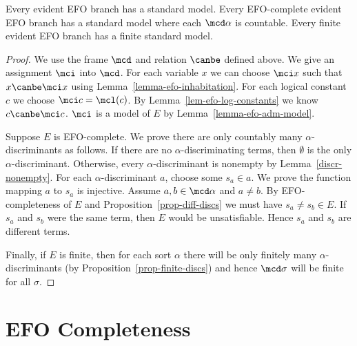 \begin{thm}
  \label{thm:efo-model-exist}
  Every evident EFO branch has a standard model.
  Every EFO-complete evident EFO branch has a standard model where each $\mcd\alpha$ is countable.
  Every finite evident EFO branch has a finite standard model.
\end{thm}
\begin{proof}
  We use the frame $\mcd$ and relation $\canbe$ defined above.
  We give an assignment $\mci$ into $\mcd$.
  For each variable $x$
  we can choose $\mci x$ such that $x\canbe \mci x$
  using Lemma~\ref{lemma-efo-inhabitation}.
  For each logical constant $c$ we choose $\mci c = \mcl (c)$.
  By Lemma~\ref{lem-efo-log-constants} we know $c\canbe \mci c$.
$\mci$ is a model of $E$ by Lemma~\ref{lemma-efo-adm-model}.

  Suppose $E$ is EFO-complete.  We prove there are only countably many $\alpha$-discriminants as follows.
  If there are no $\alpha$-discriminating terms, then $\emptyset$ is the only $\alpha$-discriminant.
  Otherwise, every $\alpha$-discriminant is nonempty by Lemma~\ref{discr-nonempty}.  For each $\alpha$-discriminant $a$, choose some $s_a\in a$.
  We prove the function mapping $a$ to $s_a$ is injective.  Assume $a,b\in\mcd\alpha$ and $a\not=b$.
  By EFO-completeness of $E$ and Proposition~\ref{prop-diff-discs} we must have $s_a\not= s_b \in E$.
  If $s_a$ and $s_b$ were the same term, then $E$ would be unsatisfiable.  Hence $s_a$ and $s_b$ are different terms.

  Finally,
  if $E$ is finite, then for each sort $\alpha$ there will be only finitely many $\alpha$-discriminants
  (by Proposition~\ref{prop-finite-discs})
  and hence $\mcd\sigma$ will be finite for all $\sigma$.
\end{proof}

\section{EFO Completeness}\label{sec:efo-complete}

